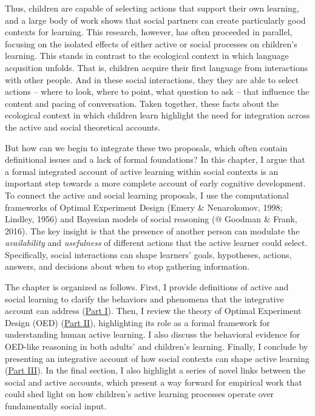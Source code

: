\documentclass[oneside]{report}
\begin{document}
Thus, children are capable of selecting actions that support their own
learning, and a large body of work shows that social partners can create
particularly good contexts for learning. This research, however, has
often proceeded in parallel, focusing on the isolated effects of either
active or social processes on children's learning. This stands in
contrast to the ecological context in which language acqusition unfolds.
That is, children acquire their first language from interactions with
other people. And in these social interactions, they they are able to
select actions -- where to look, where to point, what question to ask --
that influence the content and pacing of conversation. Taken together,
these facts about the ecological context in which children learn
highlight the need for integration across the active and social
theoretical accounts.

But how can we begin to integrate these two proposals, which often
contain definitional issues and a lack of formal foundations? In this
chapter, I argue that a formal integrated account of active learning
within social contexts is an important step towards a more complete
account of early cognitive development. To connect the active and social
learning proposals, I use the computational frameworks of Optimal
Experiment Design (Emery \& Nenarokomov, 1998; Lindley, 1956) and
Bayesian models of social reasoning (@ Goodman \& Frank, 2016). The key
insight is that the presence of another person can modulate the
\emph{availability} and \emph{usefulness} of different actions that the
active learner could select. Specifically, social interactions can shape
learners' goals, hypotheses, actions, answers, and decisions about when
to stop gathering information.

The chapter is organized as follows. First, I provide definitions of
active and social learning to clarify the behaviors and phenomena that
the integrative account can address (\protect\hyperlink{scope}{Part I}).
Then, I review the theory of Optimal Experiment Design (OED)
(\protect\hyperlink{oed}{Part II}), highlighting its role as a formal
framework for understanding human active learning. I also discuss the
behavioral evidence for OED-like reasoning in both adults' and
children's learning. Finally, I conclude by presenting an integrative
account of how social contexts can shape active learning
(\protect\hyperlink{active_social}{Part III}). In the final section, I
also highlight a series of novel links between the social and active
accounts, which present a way forward for empirical work that could shed
light on how children's active learning processes operate over
fundamentally social input.
\end{document}
